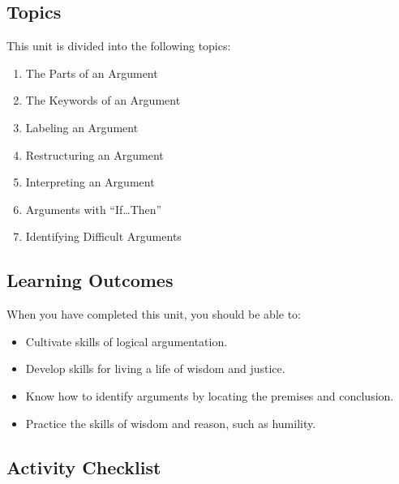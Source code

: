 \documentclass[
]{book}
\providecommand{\tightlist}{%
  \setlength{\itemsep}{0pt}\setlength{\parskip}{0pt}}
\begin{document}
\hypertarget{topics-1}{%
\subsection*{Topics}\label{topics-1}}

This unit is divided into the following topics:

\begin{enumerate}
\def\labelenumi{\arabic{enumi}.}
\tightlist
\item
  The Parts of an Argument\\
\item
  The Keywords of an Argument\\
\item
  Labeling an Argument\\
\item
  Restructuring an Argument\\
\item
  Interpreting an Argument\\
\item
  Arguments with ``If\ldots Then''\\
\item
  Identifying Difficult Arguments
\end{enumerate}

\hypertarget{learning-outcomes-1}{%
\subsection*{Learning Outcomes}\label{learning-outcomes-1}}

When you have completed this unit, you should be able to:

\begin{itemize}
\tightlist
\item
  Cultivate skills of logical argumentation.\\
\item
  Develop skills for living a life of wisdom and justice.\\
\item
  Know how to identify arguments by locating the premises and conclusion.\\
\item
  Practice the skills of wisdom and reason, such as humility.
\end{itemize}

\hypertarget{activity-checklist-1}{%
\subsection*{Activity Checklist}\label{activity-checklist-1}}
\end{document}
